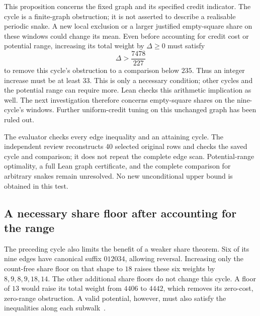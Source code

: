 \documentclass[11pt,a4paper]{article}
\theoremstyle{definition}
\theoremstyle{remark}
\begin{document}
This proposition concerns the fixed graph and its specified credit indicator.
The cycle is a finite-graph obstruction; it is not asserted to describe a
realisable periodic snake. A new local exclusion or a larger justified
empty-square share on these windows could change its mean. Even before
accounting for credit cost or potential range, increasing its total weight
by $\Delta\ge0$ must satisfy
\[
\Delta>\frac{7478}{227}
\]
to remove this cycle's obstruction to a comparison below $235$. Thus an
integer increase must be at least $33$. This is only a necessary condition;
other cycles and the potential range can require more. Lean checks this
arithmetic implication as well. The next investigation therefore concerns
empty-square shares on the nine-cycle's windows. Further uniform-credit
tuning on this unchanged graph has been ruled out.

The evaluator checks every edge inequality and an attaining cycle. The
independent review reconstructs 40 selected original rows and checks the
saved cycle and comparison; it does not repeat the complete edge scan.
Potential-range optimality, a full Lean graph certificate, and the complete
comparison for arbitrary snakes remain unresolved. No new unconditional
upper bound is obtained in this test.

\subsection{A necessary share floor after accounting for the range}\label{sec:share-floor-range}
The preceding cycle also limits the benefit of a weaker share theorem.
Six of its nine edges have canonical suffix $012034$, allowing reversal.
Increasing only the count-free share floor on that shape to $18$ raises
these six weights by $8,9,8,9,18,14$. The other additional share floors do
not change this cycle. A floor of $13$ would raise its total weight from
$4406$ to $4442$, which removes its zero-cost, zero-range obstruction.
A valid potential, however, must also satisfy the inequalities along each
subwalk~\cite{range143archive}.
\end{document}
